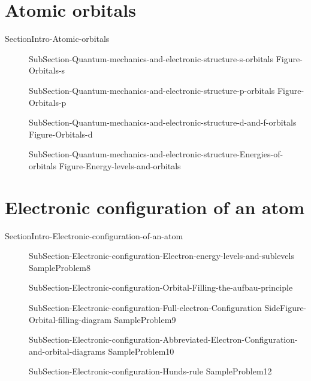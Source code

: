 \documentclass[main.tex]{subfiles}
\newcommand\chapterlabel{Ch-radiation}\setcounter{figurenewcounter}{0}\setcounter{tablenewcounter}{0}\setcounter{formulanewcounter}{0}\chapterpicture{../{\chapterlabel}/figure1}\chapterpicturelabel{PngImg}
\begin{document}
\section{Atomic orbitals}{SectionIntro-Atomic-orbitals} 
\sloppy\begin{description}
\item[] {SubSection-Quantum-mechanics-and-electronic-structure-s-orbitals} 
 {Figure-Orbitals-s}
\item[] {SubSection-Quantum-mechanics-and-electronic-structure-p-orbitals}
 {Figure-Orbitals-p}
\item[] {SubSection-Quantum-mechanics-and-electronic-structure-d-and-f-orbitals}
{Figure-Orbitals-d}
\item[] {SubSection-Quantum-mechanics-and-electronic-structure-Energies-of-orbitals}
{Figure-Energy-levels-and-orbitals}
\end{description}



\section{Electronic configuration of an atom}{SectionIntro-Electronic-configuration-of-an-atom}
\sloppy\begin{description}
\item[] {SubSection-Electronic-configuration-Electron-energy-levels-and-sublevels}
{SampleProblem8}
     \label{Fig:{\chapterlabel}\thefigurenewcounter} 
\item[]{SubSection-Electronic-configuration-Orbital-Filling-the-aufbau-principle}
\item[] {SubSection-Electronic-configuration-Full-electron-Configuration}
{SideFigure-Orbital-filling-diagram}
{SampleProblem9}
\item[] {SubSection-Electronic-configuration-Abbreviated-Electron-Configuration-and-orbital-diagrams}
{SampleProblem10}
\item[] {SubSection-Electronic-configuration-Hunds-rule}
{SampleProblem12}
\end{description}
\end{document}
